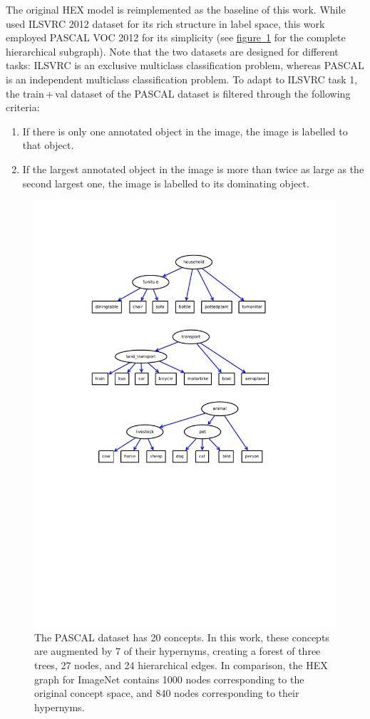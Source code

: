 \documentclass[11pt,a4paper]{article}
\begin{document}
The original HEX model is reimplemented as the baseline of this work. While \cite{deng2014large} used ILSVRC 2012 dataset for its rich structure in label space, this work employed PASCAL VOC 2012 \cite{pascal-voc-2012} for its simplicity (see \hyperref[fig:hex]{figure~\ref{fig:hex}} for the complete hierarchical subgraph). Note that the two datasets are designed for different tasks: ILSVRC is an exclusive multiclass classification problem, whereas PASCAL is an independent multiclass classification problem. To adapt to ILSVRC task 1, the train\,+\,val dataset of the PASCAL dataset is filtered through the following criteria:
\begin{enumerate}
\item If there is only one annotated object in the image, the image is labelled to that object.
\item If the largest annotated object in the image is more than twice as large as the second largest one, the image is labelled to its dominating object.
\end{enumerate}
\begin{figure}[p]
\centering
\includegraphics[scale=1.1]{full.pdf}
\caption{The PASCAL dataset has 20 concepts. In this work, these concepts are augmented by 7 of their hypernyms, creating a forest of three trees, 27 nodes, and 24 hierarchical edges. In comparison, the HEX graph for ImageNet contains 1000 nodes corresponding to the original concept space, and 840 nodes corresponding to their hypernyms.}
\label{fig:hex}
\end{figure}
\end{document}
